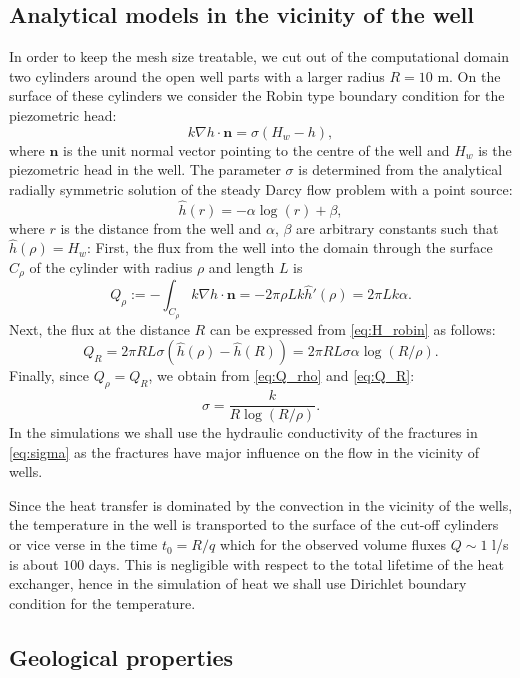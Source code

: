 \documentclass{article}
\newcommand{\eq}[1]{\begin{equation}#1\end{equation}}
\newcommand{\nn}{\vc n}
\newcommand{\vc}[1]{\boldsymbol{#1}}
\begin{document}
\subsection{Analytical models in the vicinity of the well}
In order to keep the mesh size treatable, we cut out of the computational domain two cylinders around the open well parts with a larger radius $R=10$ m.
On the surface of these cylinders we consider the Robin type boundary condition for the piezometric head:
%
\eq{\label{eq:H_robin} k\nabla h\cdot\nn = \sigma(H_w-h), }
%
where $\nn$ is the unit normal vector pointing to the centre of the well and $H_w$ is the piezometric head in the well.
The parameter $\sigma$ is determined from the analytical radially symmetric solution
of the steady Darcy flow problem with a point source:
\[
    \hat h(r) = -\alpha \log (r) + \beta,
\]
where $r$ is the distance from the well and $\alpha$, $\beta$ are arbitrary constants such that $\hat h(\rho)=H_w$:
First, the flux from the well into the domain through the surface $C_\rho$ of the cylinder with radius $\rho$ and length $L$ is
%  
\eq{\label{eq:Q_rho}    Q_\rho := -\int_{C_\rho} k\nabla h\cdot\nn = -2\pi \rho L k \hat h'(\rho) = 2\pi L k \alpha. }
%
Next, the flux at the distance $R$ can be expressed from \eqref{eq:H_robin} as follows:
%
\eq{\label{eq:Q_R}   Q_R = 2\pi R L \sigma (\hat h(\rho) - \hat h(R)) = 2\pi R L \sigma \alpha \log(R/\rho).}
%
Finally, since $Q_\rho=Q_R$, we obtain from \eqref{eq:Q_rho} and \eqref{eq:Q_R}:
\eq{ \label{eq:sigma} \sigma = \frac{k}{R\log(R/\rho)}. }
In the simulations we shall use the hydraulic conductivity of the fractures in \eqref{eq:sigma} as the fractures have major influence on the flow in the vicinity of wells.

Since the heat transfer is dominated by the convection in the vicinity of the wells, the temperature in the well is transported to the surface of the cut-off cylinders or vice verse in the time $t_0 = R/q$ which for the observed volume fluxes $Q\sim 1$ l/s is about $100$ days. This is negligible with respect to the total lifetime of the heat exchanger, hence in the simulation of heat we shall use Dirichlet boundary condition for the temperature.


\subsection{Geological properties}
\end{document}
